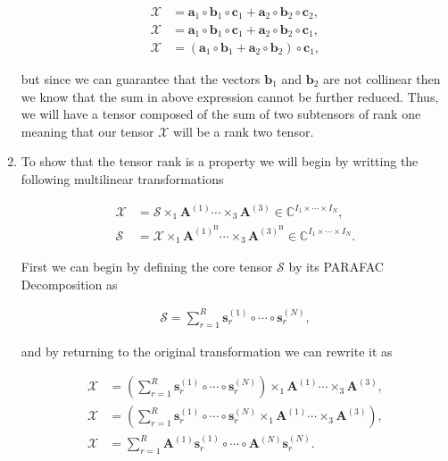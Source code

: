 \documentclass[a4paper,10pt]{article}
\begin{document}
\begin{enumerate}
        \begin{align}
            \mathcal{X} &= \boldsymbol{a}_{1} \circ \boldsymbol{b}_{1} \circ \boldsymbol{c}_{1} + \boldsymbol{a}_{2} \circ \boldsymbol{b}_{2} \circ \boldsymbol{c}_{2}, \\
            \mathcal{X} &= \boldsymbol{a}_{1} \circ \boldsymbol{b}_{1} \circ \boldsymbol{c}_{1} + \boldsymbol{a}_{2} \circ \boldsymbol{b}_{2} \circ \boldsymbol{c}_{1}, \\
            \mathcal{X} &= (\boldsymbol{a}_{1} \circ \boldsymbol{b}_{1} + \boldsymbol{a}_{2} \circ \boldsymbol{b}_{2}) \circ \boldsymbol{c}_{1},
        \end{align}

        but since we can guarantee that the vectors $\boldsymbol{b}_{1}$ and $\boldsymbol{b}_{2}$ are not collinear then we know that the sum in above expression cannot be further reduced. Thus, we will have a tensor 
        composed of the sum of two subtensors of rank one meaning that our tensor $\mathcal{X}$  will be a rank two tensor.

    \item To show that the tensor rank is a property we will begin by writting the following multilinear transformations
    
        \begin{align}
            \mathcal{X} &= \mathcal{S} \times_{1} \boldsymbol{A}^{(1)} \cdots \times_{3} \boldsymbol{A}^{(3)} \in \mathbb{C}^{I_{1} \times \cdots \times I_{N}}, \\
            \mathcal{S} &= \mathcal{X} \times_{1} \boldsymbol{A}^{(1)^{\text{H}}} \cdots \times_{3} \boldsymbol{A}^{(3)^{\text{H}}} \in \mathbb{C}^{I_{1} \times \cdots \times I_{N}}.
        \end{align}

        First we can begin by defining the core tensor $\mathcal{S}$ by its PARAFAC Decomposition as

        \begin{align}
            \mathcal{S} = \sum^{R}_{r = 1} \boldsymbol{s}^{(1)}_{r} \circ \cdots \circ \boldsymbol{s}^{(N)}_{r},
        \end{align}

        and by returning to the original transformation we can rewrite it as 

        \begin{align}
            \mathcal{X} &= \left(\sum^{R}_{r = 1} \boldsymbol{s}^{(1)}_{r} \circ \cdots \circ \boldsymbol{s}^{(N)}_{r}\right) \times_{1} \boldsymbol{A}^{(1)} \cdots \times_{3} \boldsymbol{A}^{(3)}, \\
            \mathcal{X} &= \left(\sum^{R}_{r = 1} \boldsymbol{s}^{(1)}_{r} \circ \cdots \circ \boldsymbol{s}^{(N)}_{r} \times_{1} \boldsymbol{A}^{(1)} \cdots \times_{3} \boldsymbol{A}^{(3)}\right), \\
            \mathcal{X} &= \sum^{R}_{r = 1} \boldsymbol{A}^{(1)} \boldsymbol{s}^{(1)}_{r} \circ \cdots \circ \boldsymbol{A}^{(N)} \boldsymbol{s}^{(N)}_{r}.
        \end{align}


\end{enumerate}
\end{document}
